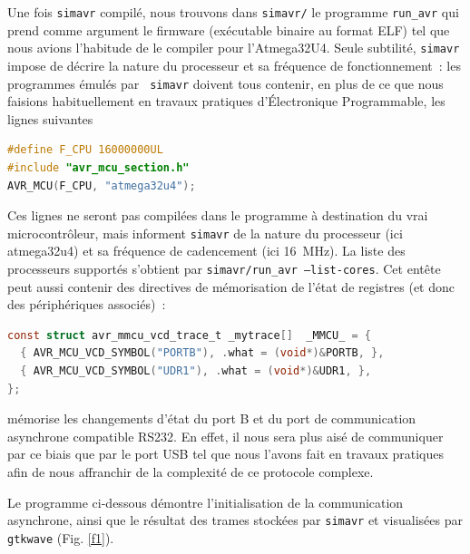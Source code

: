 \documentclass[a4paper]{article}
\begin{document}
Une fois {\tt simavr} compil\'e, nous trouvons dans {\tt simavr/} le programme 
{\tt run\_avr} qui prend comme argument le firmware (ex\'ecutable binaire au 
format ELF) tel que nous avions l'habitude de le compiler pour l'Atmega32U4. 
Seule subtilit\'e, {\tt simavr} impose de d\'ecrire la nature du processeur 
et sa fr\'equence de fonctionnement~: les programmes \'emul\'es par {\tt 
simavr} doivent tous contenir, en plus de ce que nous faisions habituellement 
en travaux pratiques d'\'Electronique Programmable, les lignes suivantes 
\begin{lstlisting}[language=C]
#define F_CPU 16000000UL
#include "avr_mcu_section.h"     
AVR_MCU(F_CPU, "atmega32u4"); 
\end{lstlisting}

Ces lignes ne seront pas compil\'ees dans le programme \`a destination du 
vrai microcontr\^oleur, mais informent {\tt simavr} de la nature du processeur 
(ici atmega32u4) et sa fr\'equence de cadencement (ici 16~MHz). La liste des 
processeurs support\'es s'obtient par {\tt simavr/run\_avr --list-cores}.
Cet ent\^ete peut aussi contenir des directives de m\'emorisation de l'\'etat 
de registres (et donc des p\'eriph\'eriques associ\'es)~: 
\begin{lstlisting}[language=C]
const struct avr_mmcu_vcd_trace_t _mytrace[]  _MMCU_ = {
  { AVR_MCU_VCD_SYMBOL("PORTB"), .what = (void*)&PORTB, },
  { AVR_MCU_VCD_SYMBOL("UDR1"), .what = (void*)&UDR1, },
};
\end{lstlisting}
\noindent m\'emorise les changements d'\'etat du port B et du port de 
communication asynchrone compatible RS232. En effet, il nous sera plus ais\'e 
de communiquer par ce biais que par le port USB tel que nous l'avons fait en 
travaux pratiques afin de nous affranchir de la complexit\'e de ce protocole 
complexe.

Le programme ci-dessous d\'emontre l'initialisation de la communication 
asynchrone, ainsi que le r\'esultat des trames stock\'ees par {\tt simavr} 
et visualis\'ees par {\tt gtkwave} (Fig. \ref{f1}).
\end{document}
